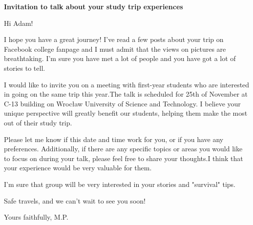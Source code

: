\documentclass{letter}
\begin{document}
\begin{letter}{\textbf{Invitation to talk about your study trip experiences}}

    \begin{large}
        
    
    \opening{Hi Adam!}

    I hope you have a great journey! I've read a few posts about your trip on Facebook college fanpage and I must
    admit that the views on pictures are breathtaking. I'm sure you have met a lot of people and you have got a
    lot of stories to tell. 
    
    I would like to invite you on a meeting with first-year students who are interested in
    going on the same trip this year.The talk is scheduled for 
    25th of November at C-13 building on Wrocław University of Science and Technology. 
    I believe your unique perspective will greatly benefit our students, helping them make the most out of their study trip.

    Please let me know if this date and time work for you, or if you have any preferences. 
    Additionally, if there are any specific topics or areas you would like to focus on during your talk, 
    please feel free to share your thoughts.I think that your experience would be very valuable for them.

    I'm sure that group will be very interested in your stories and "survival" tips. 
    
    Safe travels, and we can't wait to see you soon!
    \closing{Yours faithfully, M.P.}
\end{large}
    
\end{letter}
\end{document}
